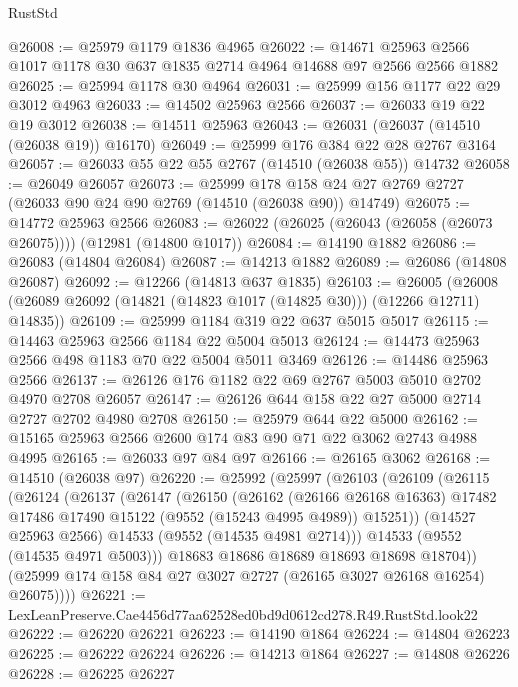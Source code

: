 \begin{lexlean}{RustStd}
\begin{coremodule}
@26008 := @25979 @1179 @1836 @4965
@26022 := @14671 @25963 @2566 @1017 @1178 @30 @637 @1835 @2714 @4964 @14688 @97 @2566 @2566 @1882
@26025 := @25994 @1178 @30 @4964
@26031 := @25999 @156 @1177 @22 @29 @3012 @4963
@26033 := @14502 @25963 @2566
@26037 := @26033 @19 @22 @19 @3012
@26038 := @14511 @25963
@26043 := @26031 (@26037 (@14510 (@26038 @19)) @16170)
@26049 := @25999 @176 @384 @22 @28 @2767 @3164
@26057 := @26033 @55 @22 @55 @2767 (@14510 (@26038 @55)) @14732
@26058 := @26049 @26057
@26073 := @25999
    @178
    @158
    @24
    @27
    @2769
    @2727
    (@26033 @90 @24 @90 @2769 (@14510 (@26038 @90)) @14749)
@26075 := @14772 @25963 @2566
@26083 := @26022 (@26025 (@26043 (@26058 (@26073 @26075)))) (@12981 (@14800 @1017))
@26084 := @14190 @1882
@26086 := @26083 (@14804 @26084)
@26087 := @14213 @1882
@26089 := @26086 (@14808 @26087)
@26092 := @12266 (@14813 @637 @1835)
@26103 := @26005
    (@26008 (@26089 @26092 (@14821 (@14823 @1017 (@14825 @30))) (@12266 @12711) @14835))
@26109 := @25999 @1184 @319 @22 @637 @5015 @5017
@26115 := @14463 @25963 @2566 @1184 @22 @5004 @5013
@26124 := @14473 @25963 @2566 @498 @1183 @70 @22 @5004 @5011 @3469
@26126 := @14486 @25963 @2566
@26137 := @26126 @176 @1182 @22 @69 @2767 @5003 @5010 @2702 @4970 @2708 @26057
@26147 := @26126 @644 @158 @22 @27 @5000 @2714 @2727 @2702 @4980 @2708
@26150 := @25979 @644 @22 @5000
@26162 := @15165 @25963 @2566 @2600 @174 @83 @90 @71 @22 @3062 @2743 @4988 @4995
@26165 := @26033 @97 @84 @97
@26166 := @26165 @3062
@26168 := @14510 (@26038 @97)
@26220 := @25992
    (@25997
      (@26103
        (@26109
          (@26115
            (@26124
              (@26137
                (@26147
                  (@26150
                    (@26162
                      (@26166 @26168 @16363)
                      @17482
                      @17486
                      @17490
                      @15122
                      (@9552 (@15243 @4995 @4989))
                      @15251))
                  (@14527 @25963 @2566)
                  @14533
                  (@9552 (@14535 @4981 @2714)))
                @14533
                (@9552 (@14535 @4971 @5003)))
              @18683
              @18686
              @18689
              @18693
              @18698
              @18704))
          (@25999 @174 @158 @84 @27 @3027 @2727 (@26165 @3027 @26168 @16254) @26075))))
@26221 := LexLeanPreserve.Cae4456d77aa62528ed0bd9d0612cd278.R49.RustStd.look22
@26222 := @26220 @26221
@26223 := @14190 @1864
@26224 := @14804 @26223
@26225 := @26222 @26224
@26226 := @14213 @1864
@26227 := @14808 @26226
@26228 := @26225 @26227

\end{coremodule}
\end{lexlean}
